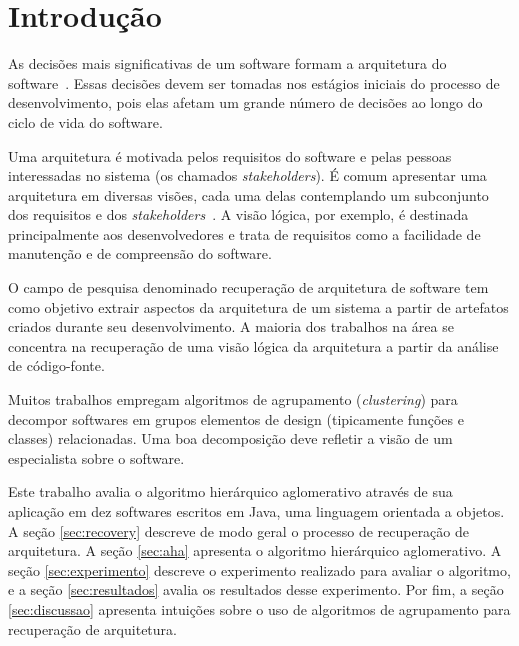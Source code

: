 \section{Introdução} \label{intro}

As decisões mais significativas de um software formam a
arquitetura do software~\cite{Booch2006}. Essas decisões devem ser tomadas nos
estágios iniciais do processo de desenvolvimento, pois elas afetam um grande 
número de decisões ao longo do ciclo de vida do software.

Uma arquitetura é motivada pelos requisitos do software e pelas pessoas 
interessadas no sistema (os chamados \emph{stakeholders}).
É comum apresentar uma arquitetura em diversas visões, cada uma delas 
contemplando um subconjunto dos requisitos e dos 
\emph{stakeholders}~\cite{Kruchten1995}.
A visão lógica, por exemplo, é destinada principalmente aos desenvolvedores 
e trata de requisitos como a facilidade de manutenção e de compreensão do
software.

O campo de pesquisa denominado recuperação de arquitetura de software tem como
objetivo extrair aspectos da arquitetura de um sistema a partir de artefatos
criados durante seu desenvolvimento. A maioria dos trabalhos na
área se concentra na recuperação de uma visão lógica da arquitetura 
a partir da análise de código-fonte.

Muitos trabalhos empregam algoritmos de agrupamento
(\emph{clustering}) para decompor softwares em grupos elementos de design
(tipicamente funções e classes) relacionadas. Uma boa decomposição deve
refletir a visão de um especialista sobre o software.

Este trabalho avalia o algoritmo hierárquico aglomerativo através de sua
aplicação em dez softwares escritos em Java, uma linguagem orientada a
objetos. 
%
A seção \ref{sec:recovery} descreve de modo geral o processo de 
recuperação de arquitetura.
%
A seção \ref{sec:aha} apresenta o algoritmo hierárquico aglomerativo.
%
A seção \ref{sec:experimento} descreve o experimento realizado para avaliar
o algoritmo, e a seção \ref{sec:resultados} avalia os resultados desse
experimento.
%
Por fim, a seção \ref{sec:discussao} apresenta intuições sobre o uso de
algoritmos de agrupamento para recuperação de arquitetura.



